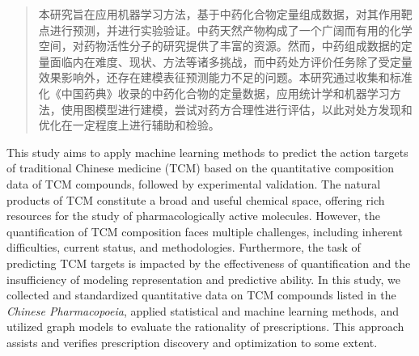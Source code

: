 

\begin{abstract}
  本研究旨在应用机器学习方法，基于中药化合物定量组成数据，对其作用靶点进行预测，并进行实验验证。中药天然产物构成了一个广阔而有用的化学空间，对药物活性分子的研究提供了丰富的资源。然而，中药组成数据的定量面临内在难度、现状、方法等诸多挑战，而中药处方评价任务除了受定量效果影响外，还存在建模表征预测能力不足的问题。本研究通过收集和标准化《中国药典》收录的中药化合物的定量数据，应用统计学和机器学习方法，使用图模型进行建模，尝试对药方合理性进行评估，以此对处方发现和优化在一定程度上进行辅助和检验。

\end{abstract}

\begin{abstract*}
  This study aims to apply machine learning methods to predict the action targets of traditional Chinese medicine (TCM) based on the quantitative composition data of TCM compounds, followed by experimental validation. The natural products of TCM constitute a broad and useful chemical space, offering rich resources for the study of pharmacologically active molecules. However, the quantification of TCM composition faces multiple challenges, including inherent difficulties, current status, and methodologies. Furthermore, the task of predicting TCM targets is impacted by the effectiveness of quantification and the insufficiency of modeling representation and predictive ability. In this study, we collected and standardized quantitative data on TCM compounds listed in the \textit{Chinese Pharmacopoeia}, applied statistical and machine learning methods, and utilized graph models to evaluate the rationality of prescriptions. This approach assists and verifies prescription discovery and optimization to some extent.

\end{abstract*}
